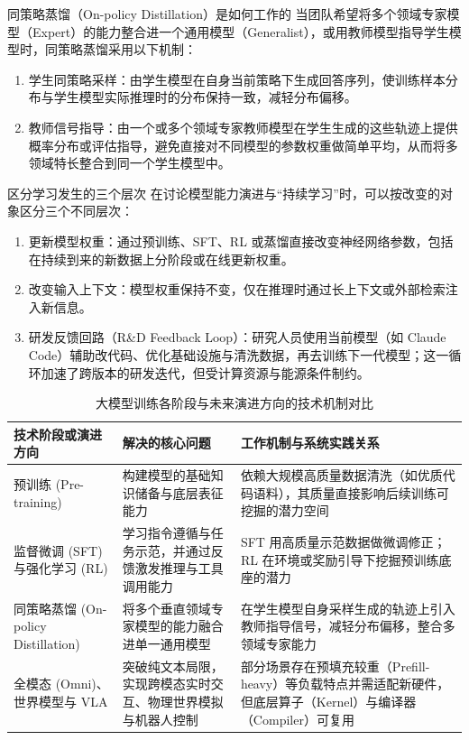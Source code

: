\documentclass[UTF8,a4paper,11pt,fontset=fandol]{ctexart}
\begin{document}
\begin{knowledgebox}{同策略蒸馏（On-policy Distillation）是如何工作的}
当团队希望将多个领域专家模型（Expert）的能力整合进一个通用模型（Generalist），或用教师模型指导学生模型时，同策略蒸馏采用以下机制：
\begin{enumerate}
\item 学生同策略采样：由学生模型在自身当前策略下生成回答序列，使训练样本分布与学生模型实际推理时的分布保持一致，减轻分布偏移。
\item 教师信号指导：由一个或多个领域专家教师模型在学生生成的这些轨迹上提供概率分布或评估指导，避免直接对不同模型的参数权重做简单平均，从而将多领域特长整合到同一个学生模型中。
\end{enumerate}
\end{knowledgebox}
\begin{warningbox}{区分学习发生的三个层次}
在讨论模型能力演进与“持续学习”时，可以按改变的对象区分三个不同层次：
\begin{enumerate}
\item 更新模型权重：通过预训练、SFT、RL 或蒸馏直接改变神经网络参数，包括在持续到来的新数据上分阶段或在线更新权重。
\item 改变输入上下文：模型权重保持不变，仅在推理时通过长上下文或外部检索注入新信息。
\item 研发反馈回路（R\&D Feedback Loop）：研究人员使用当前模型（如 Claude Code）辅助改代码、优化基础设施与清洗数据，再去训练下一代模型；这一循环加速了跨版本的研发迭代，但受计算资源与能源条件制约。
\end{enumerate}
\end{warningbox}
\begin{table}[H]\centering\small
\caption{大模型训练各阶段与未来演进方向的技术机制对比}
\begin{tabular}{>{\raggedright\arraybackslash}p{\dimexpr(\linewidth-6\tabcolsep)/3\relax}>{\raggedright\arraybackslash}p{\dimexpr(\linewidth-6\tabcolsep)/3\relax}>{\raggedright\arraybackslash}p{\dimexpr(\linewidth-6\tabcolsep)/3\relax}}
\toprule
技术阶段或演进方向 & 解决的核心问题 & 工作机制与系统实践关系\\\midrule
预训练 (Pre-training) & 构建模型的基础知识储备与底层表征能力 & 依赖大规模高质量数据清洗（如优质代码语料），其质量直接影响后续训练可挖掘的潜力空间\\[4pt]
监督微调 (SFT) 与强化学习 (RL) & 学习指令遵循与任务示范，并通过反馈激发推理与工具调用能力 & SFT 用高质量示范数据做微调修正；RL 在环境或奖励引导下挖掘预训练底座的潜力\\[4pt]
同策略蒸馏 (On-policy Distillation) & 将多个垂直领域专家模型的能力融合进单一通用模型 & 在学生模型自身采样生成的轨迹上引入教师指导信号，减轻分布偏移，整合多领域专家能力\\[4pt]
全模态 (Omni)、世界模型与 VLA & 突破纯文本局限，实现跨模态实时交互、物理世界模拟与机器人控制 & 部分场景存在预填充较重（Prefill-heavy）等负载特点并需适配新硬件，但底层算子（Kernel）与编译器（Compiler）可复用\\[4pt]
\bottomrule\end{tabular}\end{table}
\end{document}
